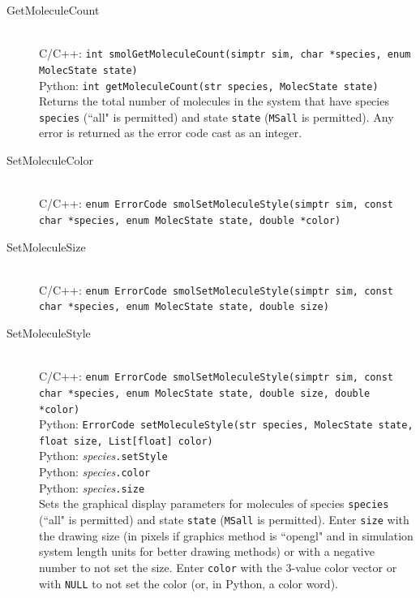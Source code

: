 \documentclass {book}
\newcommand {\ttt} {\texttt}
\begin{document}
\begin{description}
\item[GetMoleculeCount]
\hfill \\
C/C++: \ttt{int smolGetMoleculeCount(simptr sim, char *species, enum MolecState state)}\\
Python: \ttt{int getMoleculeCount(str species, MolecState state)}\\
Returns the total number of molecules in the system that have species \ttt{species} (``all" is permitted) and state \ttt{state} (\ttt{MSall} is permitted). Any error is returned as the error code cast as an integer.

\item[SetMoleculeColor]
\hfill \\
C/C++: \ttt{enum ErrorCode smolSetMoleculeStyle(simptr sim, const char *species, enum MolecState state, double *color)}\\

\item[SetMoleculeSize]
\hfill \\
C/C++: \ttt{enum ErrorCode smolSetMoleculeStyle(simptr sim, const char *species, enum MolecState state, double size)}\\


\item[SetMoleculeStyle]
\hfill \\
C/C++: \ttt{enum ErrorCode smolSetMoleculeStyle(simptr sim, const char *species, enum MolecState state, double size, double *color)}\\
Python: \ttt{ErrorCode setMoleculeStyle(str species, MolecState state, float size, List[float] color)}\\
Python: \textit{species}\ttt{.setStyle}\\
Python: \textit{species}\ttt{.color}\\
Python: \textit{species}\ttt{.size}\\
Sets the graphical display parameters for molecules of species \ttt{species} (``all" is permitted) and state \ttt{state} (\ttt{MSall} is permitted). Enter \ttt{size} with the drawing size (in pixels if graphics method is ``opengl" and in simulation system length units for better drawing methods) or with a negative number to not set the size. Enter \ttt{color} with the 3-value color vector or with \ttt{NULL} to not set the color (or, in Python, a color word).

\end{description}
\end{document}
